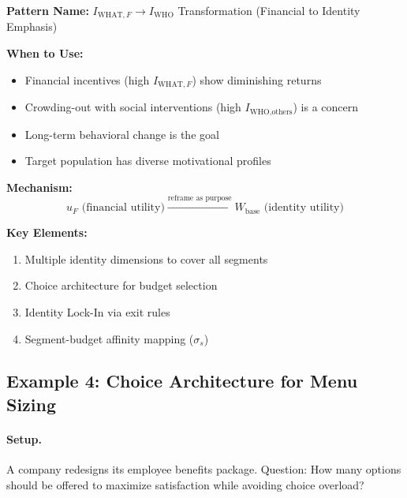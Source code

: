 \begin{tcolorbox}[colback=green!5!white, colframe=green!75!black,
    title=\textbf{Design Pattern: Dimension Transformation}]

\textbf{Pattern Name:} $I_{\text{WHAT},F} \rightarrow I_{\text{WHO}}$ Transformation (Financial to Identity Emphasis)

\textbf{When to Use:}
\begin{itemize}[nosep]
    \item Financial incentives (high $I_{\text{WHAT},F}$) show diminishing returns
    \item Crowding-out with social interventions (high $I_{\text{WHO},\text{others}}$) is a concern
    \item Long-term behavioral change is the goal
    \item Target population has diverse motivational profiles
\end{itemize}

\textbf{Mechanism:}
\begin{equation}
\boxed{u_F \text{ (financial utility)} \xrightarrow{\text{reframe as purpose}} W_{\text{base}} \text{ (identity utility)}}
\end{equation}

\textbf{Key Elements:}
\begin{enumerate}[nosep]
    \item Multiple identity dimensions to cover all segments
    \item Choice architecture for budget selection
    \item Identity Lock-In via exit rules
    \item Segment-budget affinity mapping ($\sigma_s$)
\end{enumerate}

\end{tcolorbox}


\subsection{Example 4: Choice Architecture for Menu Sizing}
\label{sec:hhh-example-choice-architecture}

\paragraph{Setup.} A company redesigns its employee benefits package. Question: How many options should be offered to maximize satisfaction while avoiding choice overload?

